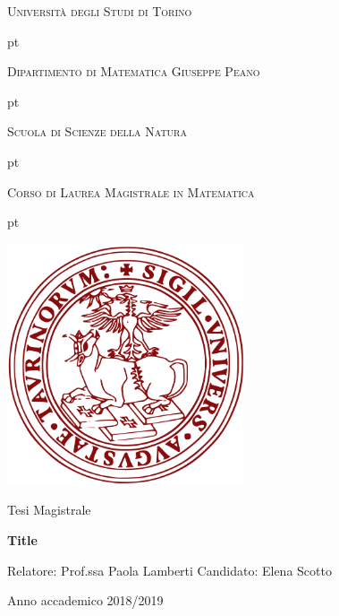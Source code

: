 \documentclass[a4paper,10 pt,titlepage,twoside]{book}
\theoremstyle{plain}
\theoremstyle{definition}
\theoremstyle{remark}
\begin{document}
\thispagestyle{empty}

\centerline {\huge{\textsc{Università degli Studi di Torino}}}
 pt

\centerline {\Large{\textsc{Dipartimento di Matematica Giuseppe Peano}}}

 pt

\centerline {\Large{\textsc{Scuola di Scienze della Natura}}}

 pt

\centerline {\Large{\textsc{Corso di Laurea Magistrale in Matematica}}}


 pt





\centerline {\includegraphics[width=7cm]{logo.jpg}}
\vskip 1.2cm
\centerline {\normalsize {Tesi Magistrale}} 

\vskip 0.7cm

\centerline {\Large {\bf Title}}

\vskip 1.7cm

\noindent Relatore: Prof.ssa Paola Lamberti
\hfill  {Candidato: Elena Scotto }\\





\vskip 2.7cm


\centerline{Anno accademico 2018/2019}

\tableofcontents

% 
%
\end{document}

